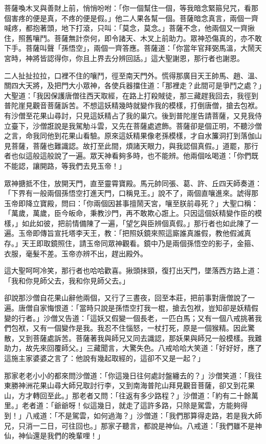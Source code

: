 菩薩喚木叉與善財上前，悄悄吩咐：「你一個幫住一個，等我暗念緊箍兒咒，看那個害疼的便是真，不疼的便是假。」他二人果各幫一個。菩薩暗念真言，兩個一齊喊疼，都抱著頭，地下打滾，只叫：「莫念，莫念。」菩薩不念，他兩個又一齊揪住，照舊嚷鬥。菩薩無計奈何，即令諸天、木叉上前助力。眾神恐傷真的，亦不敢下手。菩薩叫聲「孫悟空」，兩個一齊答應。菩薩道：「你當年官拜弼馬溫，大鬧天宮時，神將皆認得你，你且上界去分辨回話。」這大聖謝恩，那行者也謝恩。

二人扯扯拉拉，口裡不住的嚷鬥，徑至南天門外。慌得那廣目天王帥馬、趙、溫、關四大天將，及把門大小眾神，各使兵器擋住道：「那裡走？此間可是爭鬥之處？」大聖道：「我因保護唐僧往西天取經，在路上打殺賊徒，那三藏趕我回去，我徑到普陀崖見觀音菩薩訴苦。不想這妖精幾時就變作我的模樣，打倒唐僧，搶去包袱。有沙僧至花果山尋討，只見這妖精占了我的巢穴。後到普陀崖告請菩薩，又見我侍立臺下，沙僧誑說是我駕觔斗雲，又先在菩薩處遮飾。菩薩卻是個正明，不聽沙僧之言，命我同他到花果山看驗。原來這妖精果像老孫模樣，才自水簾洞打到落伽山見菩薩，菩薩也難識認。故打至此間，煩諸天眼力，與我認個真假。」道罷，那行者也似這般這般說了一遍。眾天神看夠多時，也不能辨。他兩個吆喝道：「你們既不能認，讓開路，等我們去見玉帝！」

眾神搪抵不住，放開天門，直至靈霄寶殿。馬元帥同張、葛、許、丘四天師奏道：「下界有一般兩個孫悟空打進天門，口稱見王。」說不了，兩個直嚷進來。諕得那玉帝即降立寶殿，問曰：「你兩個因甚事擅鬧天宮，嚷至朕前尋死？」大聖口稱：「萬歲，萬歲，臣今皈命，秉教沙門，再不敢欺心誑上。只因這個妖精變作臣的模樣，」如此如彼，把前情備陳了一遍，「望乞與臣辨個真假。」那行者也如此陳了一遍。玉帝即傳旨宣托塔李天王，教：「把照妖鏡來照這廝誰真誰假，教他假滅真存。」天王即取鏡照住，請玉帝同眾神觀看。鏡中乃是兩個孫悟空的影子，金箍、衣服，毫髮不差。玉帝亦辨不出，趕出殿外。

這大聖呵呵冷笑，那行者也哈哈歡喜。揪頭抹頸，復打出天門，墜落西方路上道：「我和你見師父去，我和你見師父去。」

卻說那沙僧自花果山辭他兩個，又行了三晝夜，回至本莊，把前事對唐僧說了一遍。唐僧自家悔恨道：「當時只說是孫悟空打我一棍，搶去包袱，豈知卻是妖精假變的行者。」沙僧又告道：「這妖又假變一個長老，一匹白馬；又有一個八戒挑著我們包袱，又有一個變作是我。我忍不住惱怒，一杖打死，原是一個猴精。因此驚散，又到菩薩處訴苦。菩薩著我與師兄又同去識認，那妖果與師兄一般模樣。我難助力，故先來回覆師父。」三藏聞言，大驚失色。八戒哈哈大笑道：「好好好，應了這施主家婆婆之言了：他說有幾起取經的，這卻不又是一起？」

那家老老小小的都來問沙僧道：「你這幾日往何處討盤纏去的？」沙僧笑道：「我往東勝神洲花果山尋大師兄取討行李，又到南海普陀山拜見觀音菩薩，卻又到花果山，方才轉回至此。」那老者又問：「往返有多少路程？」沙僧道：「約有二十餘萬里。」老者道：「爺爺呀！似這幾日，就走了這許多路，只除是駕雲，方能夠得到！」八戒道：「不是駕雲，如何過海？」沙僧道：「我們那算得走路，若是我大師兄，只消一二日，可往回也。」那家子聽言，都說是神仙。八戒道：「我們雖不是神仙，神仙還是我們的晚輩哩！」

